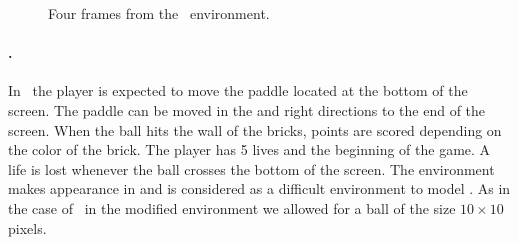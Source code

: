 \begin{figure}[H]
%
\caption{Four frames from the \pong\ environment. }
\label{fig:pong_original}
\end{figure}


\paragraph{\breakout.} In \breakout\ the player is expected to move the paddle located at the bottom of the screen. The paddle can be moved in the and right directions to the end of the screen. When the ball hits the wall of the bricks, points are scored depending on the color of the brick. The player has 5 lives and the beginning of the game. A life is lost whenever the ball crosses the bottom of the screen.  The environment makes appearance in \cite{recurrent} and is considered as a difficult environment to model \cite[page 18]{recurrent}. As in the case of \pong\ in the modified environment we allowed for a ball of the size $10\times 10$ pixels.

